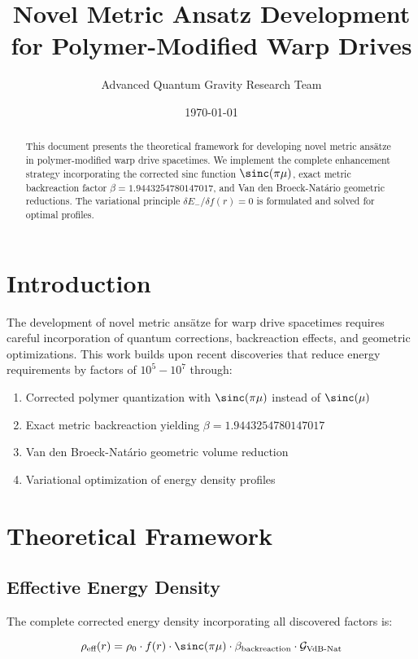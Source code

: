 \documentclass[12pt,a4paper]{article}
\title{Novel Metric Ansatz Development for Polymer-Modified Warp Drives}
\author{Advanced Quantum Gravity Research Team}
\date{\today}
\begin{document}
\maketitle

\begin{abstract}
This document presents the theoretical framework for developing novel metric ansätze in polymer-modified warp drive spacetimes. We implement the complete enhancement strategy incorporating the corrected sinc function $\sinc(\pi\mu)$, exact metric backreaction factor $\beta = 1.9443254780147017$, and Van den Broeck-Natário geometric reductions. The variational principle $\delta E_-/\delta f(r) = 0$ is formulated and solved for optimal profiles.
\end{abstract}

\section{Introduction}

The development of novel metric ansätze for warp drive spacetimes requires careful incorporation of quantum corrections, backreaction effects, and geometric optimizations. This work builds upon recent discoveries that reduce energy requirements by factors of $10^5-10^7$ through:

\begin{enumerate}
\item Corrected polymer quantization with $\sinc(\pi\mu)$ instead of $\sinc(\mu)$
\item Exact metric backreaction yielding $\beta = 1.9443254780147017$
\item Van den Broeck-Natário geometric volume reduction
\item Variational optimization of energy density profiles
\end{enumerate}

\section{Theoretical Framework}

\subsection{Effective Energy Density}

The complete corrected energy density incorporating all discovered factors is:

\begin{equation}
\rho_{\text{eff}}(r) = \rho_0 \cdot f(r) \cdot \sinc(\pi\mu) \cdot \beta_{\text{backreaction}} \cdot \mathcal{G}_{\text{VdB-Nat}}
\end{equation}
\end{document}
